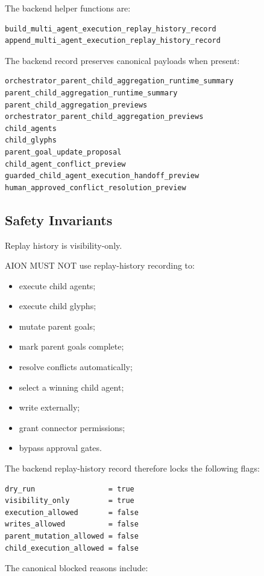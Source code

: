 The backend helper functions are:

\begin{verbatim}
build_multi_agent_execution_replay_history_record
append_multi_agent_execution_replay_history_record
\end{verbatim}

The backend record preserves canonical payloads when present:

\begin{verbatim}
orchestrator_parent_child_aggregation_runtime_summary
parent_child_aggregation_runtime_summary
parent_child_aggregation_previews
orchestrator_parent_child_aggregation_previews
child_agents
child_glyphs
parent_goal_update_proposal
child_agent_conflict_preview
guarded_child_agent_execution_handoff_preview
human_approved_conflict_resolution_preview
\end{verbatim}

\subsection{Safety Invariants}

Replay history is visibility-only.

AION MUST NOT use replay-history recording to:

\begin{itemize}
  \item execute child agents;
  \item execute child glyphs;
  \item mutate parent goals;
  \item mark parent goals complete;
  \item resolve conflicts automatically;
  \item select a winning child agent;
  \item write externally;
  \item grant connector permissions;
  \item bypass approval gates.
\end{itemize}

The backend replay-history record therefore locks the following flags:

\begin{verbatim}
dry_run                 = true
visibility_only         = true
execution_allowed       = false
writes_allowed          = false
parent_mutation_allowed = false
child_execution_allowed = false
\end{verbatim}

The canonical blocked reasons include:

